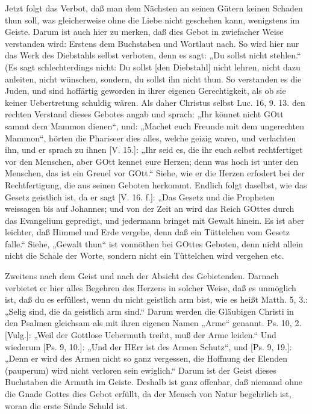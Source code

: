 Jetzt folgt das Verbot, daß man dem Nächsten an seinen Gütern keinen Schaden thun soll, was gleicherweise ohne die Liebe nicht geschehen kann, wenigstens im Geiste. Darum ist auch hier zu merken, daß dies Gebot in zwiefacher Weise verstanden wird: Erstens dem Buchstaben und Wortlaut nach. So wird hier nur das Werk des Diebstahls selbst verboten, denn es sagt: „Du sollst nicht stehlen.“ (Es sagt schlechterdings nicht: Du sollst [den Diebstahl] nicht lehren, nicht dazu anleiten, nicht wünschen, sondern, du sollst ihn nicht thun. So verstanden es die Juden, und sind hoffärtig geworden
in ihrer eigenen Gerechtigkeit, als ob sie keiner Uebertretung schuldig wären. Als daher Christus selbst Luc. 16, 9. 13. den rechten Verstand dieses Gebotes angab und sprach: „Ihr könnet nicht GOtt sammt dem Mammon dienen“, und: „Machet euch Freunde mit dem ungerechten Mammon“, hörten die Phariseer dies alles, welche geizig waren, und verlachten ihn, und er sprach zu ihnen [V. 15.]: „Ihr seid es, die ihr euch selbst rechtfertiget vor den Menschen, aber GOtt kennet eure Herzen; denn was hoch ist unter den Menschen, das ist ein Greuel vor GOtt.“ Siehe, wie er die Herzen erfodert bei der Rechtfertigung, die aus seinen Geboten herkommt. Endlich folgt daselbst, wie das Gesetz geistlich ist, da er sagt [V. 16. f.]: „Das Gesetz und die Propheten weissagen bis auf Johannes; und von der Zeit an wird das Reich GOttes durch das Evangelium gepredigt, und jedermann bringet mit Gewalt hinein. Es ist aber leichter, daß Himmel und Erde vergehe, denn daß ein Tüttelchen vom Gesetz falle.“ Siehe, „Gewalt thun“ ist vonnöthen bei GOttes Geboten, denn nicht allein nicht die Schale der Worte, sondern nicht ein Tüttelchen wird vergehen etc.

Zweitens nach dem Geist und nach der Absicht des Gebietenden. Darnach verbietet er hier alles Begehren des Herzens in solcher Weise, daß es unmöglich ist, daß du es erfüllest, wenn du nicht geistlich arm bist, wie es heißt Matth. 5, 3.: „Selig sind, die da geistlich arm sind.“ Darum werden die Gläubigen Christi in den Psalmen gleichsam als mit ihren eigenen Namen „Arme“ genannt. Ps. 10, 2. [Vulg.]: „Weil der Gottlose Uebermuth treibt, muß der Arme leiden.“ Und wiederum [Ps. 9, 10.]: „Und der HErr ist des Armen Schutz“, und [Ps. 9, 19.]: „Denn er wird des Armen nicht so ganz vergessen, die Hoffnung der Elenden (pauperum) wird nicht verloren sein ewiglich.“ Darum ist der Geist dieses Buchstaben die Armuth im Geiste. Deshalb ist ganz offenbar, daß niemand ohne die Gnade Gottes dies Gebot erfüllt, da der Mensch von Natur begehrlich ist, woran die erste Sünde Schuld ist.

